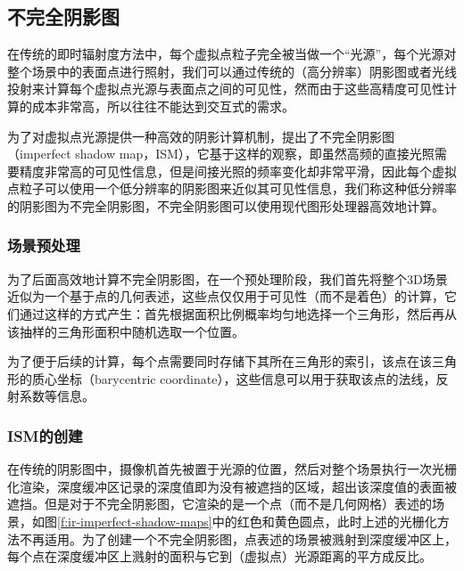 \subsection{不完全阴影图}\label{sec:ir-ISM}
在传统的即时辐射度方法中，每个虚拟点粒子完全被当做一个“光源”，每个光源对整个场景中的表面点进行照射，我们可以通过传统的（高分辨率）阴影图或者光线投射来计算每个虚拟点光源与表面点之间的可见性，然而由于这些高精度可见性计算的成本非常高，所以往往不能达到交互式的需求。

为了对虚拟点光源提供一种高效的阴影计算机制，\cite{a:ImperfectShadowMapsforEfficientComputationofIndirectIllumination}提出了不完全阴影图（imperfect shadow map，ISM），它基于这样的观察，即虽然高频的直接光照需要精度非常高的可见性信息，但是间接光照的频率变化却非常平滑，因此每个虚拟点粒子可以使用一个低分辨率的阴影图来近似其可见性信息，我们称这种低分辨率的阴影图为不完全阴影图，不完全阴影图可以使用现代图形处理器高效地计算。




\subsubsection{场景预处理}\label{sec:ir-point-based-representation}
为了后面高效地计算不完全阴影图，在一个预处理阶段，我们首先将整个3D场景近似为一个基于点的几何表述，这些点仅仅用于可见性（而不是着色）的计算，它们通过这样的方式产生：首先根据面积比例概率均匀地选择一个三角形，然后再从该抽样的三角形面积中随机选取一个位置。

为了便于后续的计算，每个点需要同时存储下其所在三角形的索引，该点在该三角形的质心坐标（barycentric coordinate），这些信息可以用于获取该点的法线，反射系数等信息。




\subsubsection{ISM的创建}
在传统的阴影图中，摄像机首先被置于光源的位置，然后对整个场景执行一次光栅化渲染，深度缓冲区记录的深度值即为没有被遮挡的区域，超出该深度值的表面被遮挡。但是对于不完全阴影图，它渲染的是一个点（而不是几何网格）表述的场景，如图\ref{f:ir-imperfect-shadow-maps}中的红色和黄色圆点，此时上述的光栅化方法不再适用。为了创建一个不完全阴影图，点表述的场景被溅射到深度缓冲区上，每个点在深度缓冲区上溅射的面积与它到（虚拟点）光源距离的平方成反比。

